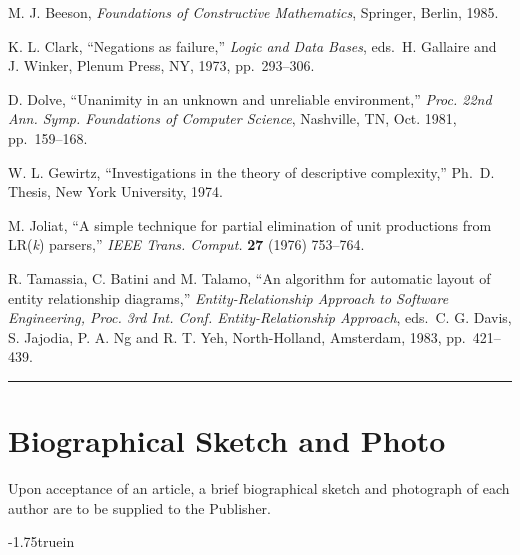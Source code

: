 \documentclass{ws-ijprai}
\begin{document}
\begin{thebibliography}{0}
 M. J. Beeson, {\it Foundations of Constructive
Mathematics}, Springer, Berlin, 1985.

 K. L. Clark, ``Negations as failure,''
{\it Logic and Data Bases}, eds.~H. Gallaire and\break
J. Winker, Plenum Press, NY, 1973, pp.~293--306.

 D. Dolve, ``Unanimity in an unknown and unreliable
environment,'' {\it Proc. 22nd Ann. Symp. Foundations of
Computer Science}, Nashville, TN, Oct. 1981, pp.~159--168.

 W. L. Gewirtz, ``Investigations in the theory of
descriptive complexity,'' Ph.~D. Thesis, New York University, 1974.

 M. Joliat, ``A simple technique for partial elimination of
unit productions from LR({\it k}) parsers,'' {\it IEEE Trans. Comput.} {\bf 27} (1976) 753--764.

 R. Tamassia, C. Batini and M. Talamo,
``An algorithm for automatic layout of entity relationship diagrams,''
{\it Entity-Relationship Approach to Software Engineering,
Proc. 3rd Int. Conf. Entity-Relationship Approach}, eds.~C. G. Davis,
S. Jajodia, P. A. Ng and R. T. Yeh, North-Holland, Amsterdam, 1983,
pp.~421--439.

\end{thebibliography}

\vspace*{-0.01in}
\noindent
\rule{12.6cm}{.1mm}

\section*{Biographical Sketch and Photo}

Upon acceptance of an article, a brief biographical sketch and
photograph of each author are to be supplied to the Publisher.


\vglue-1.75truein
\hspace*{2.45truein}
\end{document}
